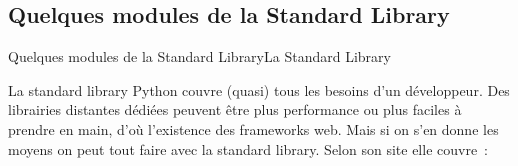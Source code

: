 \documentclass{beamer}
\begin{document}
    \subsection{Quelques modules de la Standard Library}\label{subsec:std-modules}

    \begin{frame}{Quelques modules de la Standard Library}{La Standard Library}
        \begin{tiny}
            La standard library Python couvre (quasi) tous les besoins d'un développeur.
            Des librairies distantes dédiées peuvent être plus performance ou plus faciles à prendre en main, d'où l'existence des frameworks web.
            Mais si on s'en donne les moyens on peut tout faire avec la standard library.
            \bigbreak
            Selon son site elle couvre~:


\end{tiny}
\end{frame}
\end{document}
